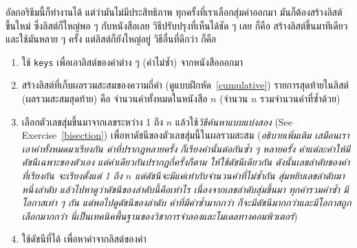 %

อัลกอริธึมนี้ก็ทำงานได้ แต่ว่ามันไม่มีประสิทธิภาพ
ทุกครั้งที่เราเลือกสุ่มคำออกมา มันก็ต้องสร้างลิสต์ขึ้นใหม่ ซึ่งลิสต์ก็ใหญ่พอ ๆ กับหนังสือเลย
วิธีปรับปรุงที่เห็นได้ชัด ๆ เลย ก็คือ สร้างลิสต์ขึ้นมาทีเดียว และใช้มันหลาย ๆ ครั้ง
แต่ลิสต์ก็ยังใหญ่อยู่
วิธีอื่นที่ดีกว่า ก็คือ

\begin{enumerate}


\item ใช้ \texttt{keys} เพื่อเอาลิสต์ของคำต่าง ๆ (คำไม่ซ้ำ) จากหนังสือออกมา


\item สร้างลิสต์ที่เก็บผลรวมสะสมของความถี่คำ (ดูแบบฝึกหัด~\ref{cumulative})
รายการสุดท้ายในลิสต์ (ผลรวมสะสมสุดท้าย) คือ จำนวนคำทั้งหมดในหนังสือ {\scriptsize$n$} (จำนวน {\scriptsize$n$} รวมจำนวนคำที่ซ้ำด้วย)
  

\item เลือกตัวเลขสุ่มขึ้นมาจากเลขระหว่าง 1 ถึง {\scriptsize$n$}
แล้วใช้\textit{วิธีค้นหาแบบแบ่งสอง} (See Exercise~\ref{bisection})
เพื่อหาดัชนีของตัวเลขสุ่มนี้ในผลรวมสะสม
(\textit{อธิบายเพิ่มเติม 
เสมือนเราเอาคำทั้งหมดมาเรียงกัน 
คำที่ปรากฎหลายครั้ง ก็เรียงคำนั้นต่อกันซ้ำ ๆ หลายครั้ง
คำแต่ละคำให้มีดัชนีเฉพาะของตัวเอง แต่คำเดียวกันปรากฏกี่ครั้งก็ตาม ให้ใช้ดัชนีเดียวกัน
ดังนั้นเลขลำดับของคำที่เรียงกัน จะเรียงตั้งแต่ 1 ถึง {\scriptsize$n$}
แต่ดัชนีจะมีแค่เท่ากับจำนวนคำที่ไม่ซ้ำกัน
สุ่มหยิบเลขลำดับมาหนึ่งลำดับ แล้วไปหาดูว่าดัชนีของลำดับนี้คือเท่าไร
เนื่องจากเลขลำดับสุ่มขึ้นมา ทุกคำรวมคำซ้ำ มีโอกาสเท่า ๆ กัน
แต่พอไปดูดัชนีของลำดับ คำที่มีคำซ้ำมากกว่า ก็จะมีดัชนีมากกว่าและมีโอกาสถูกเลือกมากกว่า
นี่เป็นเทคนิคพื้นฐานของวิชาการจำลองและโมเดลทางคอมพิวเตอร์})


\item ใช้ดัชนีที่ได้ เพื่อหาคำจากลิสต์ของคำ

\end{enumerate}



